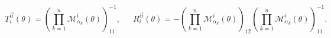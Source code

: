 \begin{equation}
T_{i}^{\vec{\alpha}}(\theta )=\left( \prod_{k=1}^{n}\mathcal{M}_{\alpha
_{k}}^{i}(\theta )\right) _{11}^{-1},\,\,\,\quad R_{i}^{\vec{\alpha}}(\theta
)=-\left( \prod_{k=1}^{n}\mathcal{M}_{\alpha _{k}}^{i}(\theta )\right)
_{12}\left( \prod_{k=1}^{n}\mathcal{M}_{\alpha _{k}}^{i}(\theta )\right)
_{11}^{-1}.  \label{ttr3}
\end{equation}

